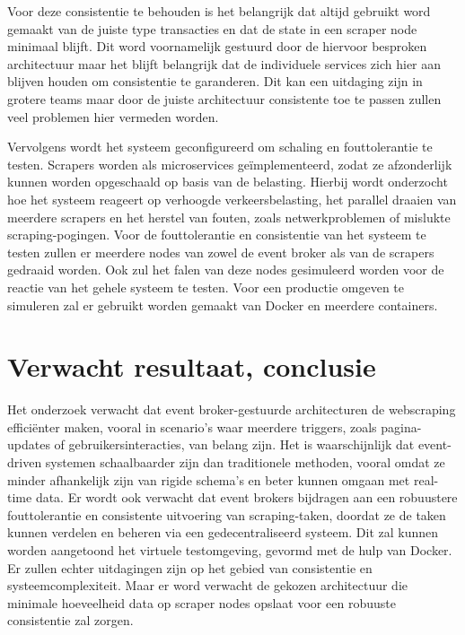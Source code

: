 Voor deze consistentie te behouden is het belangrijk dat altijd gebruikt word gemaakt van de juiste type transacties en dat de state in een scraper node minimaal blijft. Dit word voornamelijk gestuurd door de hiervoor besproken architectuur maar het blijft belangrijk dat de individuele services zich hier aan blijven houden om consistentie te garanderen. Dit kan een uitdaging zijn in grotere teams maar door de juiste architectuur consistente toe te passen zullen veel problemen hier vermeden worden.

Vervolgens wordt het systeem geconfigureerd om schaling en fouttolerantie te testen. Scrapers worden als microservices geïmplementeerd, zodat ze afzonderlijk kunnen worden opgeschaald op basis van de belasting. Hierbij wordt onderzocht hoe het systeem reageert op verhoogde verkeersbelasting, het parallel draaien van meerdere scrapers en het herstel van fouten, zoals netwerkproblemen of mislukte scraping-pogingen. Voor de fouttolerantie en consistentie van het systeem te testen zullen er meerdere nodes van zowel de event broker als van de scrapers gedraaid worden. Ook zul het falen van deze nodes gesimuleerd worden voor de reactie van het gehele  systeem te testen. Voor een productie omgeven te simuleren zal er gebruikt worden gemaakt van Docker en meerdere containers.


\section{Verwacht resultaat, conclusie}%
\label{sec:verwachte_resultaten}

Het onderzoek verwacht dat event broker-gestuurde architecturen de webscraping efficiënter maken, vooral in scenario's waar meerdere triggers, zoals pagina-updates of gebruikersinteracties, van belang zijn. Het is waarschijnlijk dat event-driven systemen schaalbaarder zijn dan traditionele methoden, vooral omdat ze minder afhankelijk zijn van rigide schema's en beter kunnen omgaan met real-time data. Er wordt ook verwacht dat event brokers bijdragen aan een robuustere fouttolerantie en consistente uitvoering van scraping-taken, doordat ze de taken kunnen verdelen en beheren via een gedecentraliseerd systeem. Dit zal kunnen worden aangetoond het virtuele testomgeving, gevormd met de hulp van Docker. Er zullen echter uitdagingen zijn op het gebied van consistentie en systeemcomplexiteit. Maar er word verwacht de gekozen architectuur die minimale hoeveelheid data op scraper nodes opslaat voor een robuuste consistentie zal zorgen.


